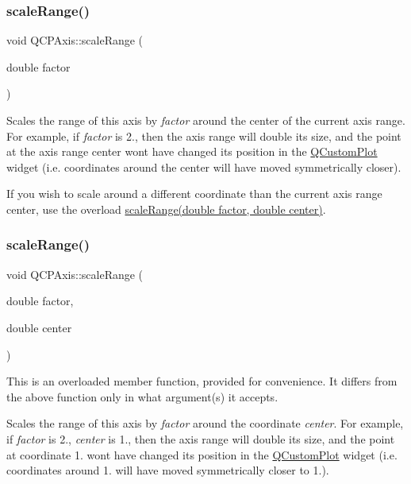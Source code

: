 \subsubsection{\texorpdfstring{scale\+Range()}{scaleRange()}\hspace{0.1cm}{\footnotesize\ttfamily [1/2]}}
{\footnotesize\ttfamily void Q\+C\+P\+Axis\+::scale\+Range (\begin{DoxyParamCaption}\item[{double}]{factor }\end{DoxyParamCaption})}

Scales the range of this axis by {\itshape factor} around the center of the current axis range. For example, if {\itshape factor} is 2., then the axis range will double its size, and the point at the axis range center won\textquotesingle{}t have changed its position in the \hyperlink{class_q_custom_plot}{Q\+Custom\+Plot} widget (i.\+e. coordinates around the center will have moved symmetrically closer).

If you wish to scale around a different coordinate than the current axis range center, use the overload \hyperlink{class_q_c_p_axis_a7072ff96fe690148f1bbcdb4f773ea1c}{scale\+Range(double factor, double center)}. \mbox{\label{class_q_c_p_axis_a7072ff96fe690148f1bbcdb4f773ea1c}} 
\subsubsection{\texorpdfstring{scale\+Range()}{scaleRange()}\hspace{0.1cm}{\footnotesize\ttfamily [2/2]}}
{\footnotesize\ttfamily void Q\+C\+P\+Axis\+::scale\+Range (\begin{DoxyParamCaption}\item[{double}]{factor,  }\item[{double}]{center }\end{DoxyParamCaption})}

This is an overloaded member function, provided for convenience. It differs from the above function only in what argument(s) it accepts.

Scales the range of this axis by {\itshape factor} around the coordinate {\itshape center}. For example, if {\itshape factor} is 2., {\itshape center} is 1., then the axis range will double its size, and the point at coordinate 1. won\textquotesingle{}t have changed its position in the \hyperlink{class_q_custom_plot}{Q\+Custom\+Plot} widget (i.\+e. coordinates around 1. will have moved symmetrically closer to 1.).

